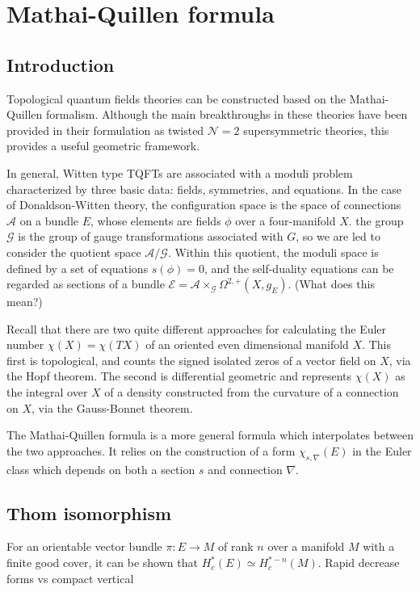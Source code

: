 
\chapter{Mathai-Quillen formula}
\label{chapter3}
\section{Introduction}
Topological quantum fields theories can be constructed based on the
Mathai-Quillen formalism. Although the main breakthroughs in these theories have
been provided in their formulation as twisted $\mathcal{N}=2$ supersymmetric
theories, this provides a useful geometric framework.\cite{TQFTbook}

In general, Witten type TQFTs are associated with a moduli problem characterized
by three basic data: fields, symmetries, and equations.
In the case of Donaldson-Witten theory, the configuration space is the space of
connections $\mathcal{A}$ on a bundle $E$, whose elements are fields 
$\phi$ over a four-manifold  $X$.  the group $\mathcal{G}$ is the group of gauge
transformations associated with $G$, so we are led to consider the quotient
space  $\mathcal{A}/\mathcal{G}$. Within this quotient, the moduli space is
defined by a set of equations $s(\phi)=0$, and the self-duality equations can be
regarded as sections of a bundle
$\mathcal{E}=\mathcal{A}\times_{\mathcal{G}}\Omega^{2,+}(X,g_E)$. (What does
this mean?)
  
Recall that there are two quite different approaches for calculating the Euler number
$\chi(X) = \chi(TX)$ of an oriented even dimensional manifold $X$. 
This first is topological, and counts
the signed isolated zeros of a vector field on $X$, via the Hopf theorem. The
second is differential geometric and represents  $\chi(X)$ as the integral over
$X$ of a density constructed from the curvature of a connection on $X$, via
the Gauss-Bonnet theorem. 

The Mathai-Quillen formula \cite{MQformula} is a more general formula which interpolates between
the two approaches. It relies on the construction of a form $\chi_{s,\nabla}(E)$ in
the Euler class which depends
on both a section  $s$ and connection  $\nabla$.  

\section{Thom isomorphism}
For an orientable vector bundle $\pi:E\to M$ of rank $n$ over a manifold $M$ 
with a finite good cover, it can be shown that  $H_c^*(E)\simeq H_c^{*-n}(M)$.\cite[Prop
6.13]{bott_tu} 
Rapid decrease forms vs compact vertical

